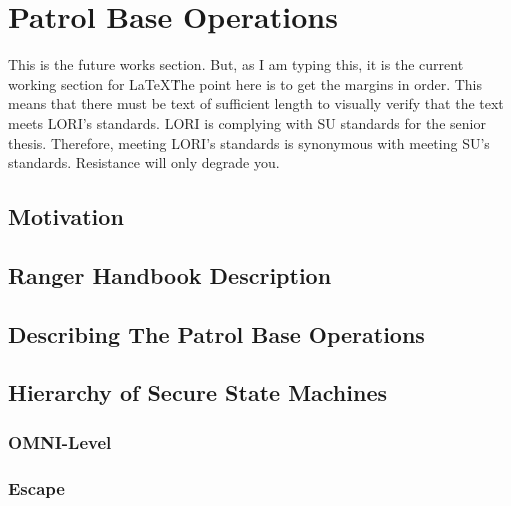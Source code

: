 \documentclass[../../main/main.tex]{subfiles}
\begin{document}
\chapter{Patrol Base Operations}
This is the future works section. But, as I am typing this, it is the current working section for \LaTeX\.  The point here is to get the margins in order.  This means that there must be text of sufficient length to visually verify that the text meets LORI's standards.  LORI is complying with SU standards for the senior thesis.  Therefore, meeting LORI's standards is synonymous with meeting SU's standards.  Resistance will only degrade you.
\section{Motivation}

\section{Ranger Handbook Description}

\section{Describing The Patrol Base Operations}

\section{Hierarchy of Secure State Machines}

\subsection{OMNI-Level}

\subsection{Escape}

\end{document}
